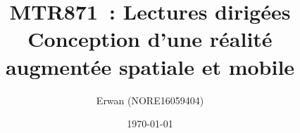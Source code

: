 \documentclass[letterpaper,twoside,12pt]{article}
\title{
	MTR871~: Lectures dirigées \\
	\large Conception d'une réalité augmentée spatiale et mobile}
\author{Erwan \bsc{Normand} (NORE16059404)}
\date{\today}
\begin{document}
	
	\maketitle
	
	

	\newpage
	\begin{spacing}{1}
		
		
	\end{spacing}
\end{document}
